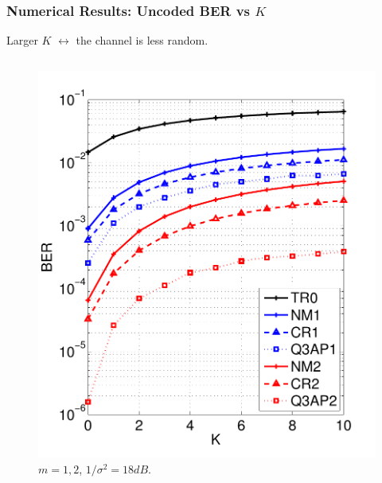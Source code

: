 \documentclass{beamer}
\begin{document}
\begin{frame}
  \frametitle{Numerical Results: Uncoded BER vs $K$}
  Larger $K$ $\leftrightarrow$ the channel is less random.
  \begin{columns}
    \begin{figure}
      \includegraphics[width=1.0\textwidth]{figs/BER_K_MonteCarlo_64QAM_18.pdf}
      \caption{$m=1,2$, $1/\sigma^2 = 18dB$.}
    \end{figure}
    

\end{columns}
\end{frame}
\end{document}
